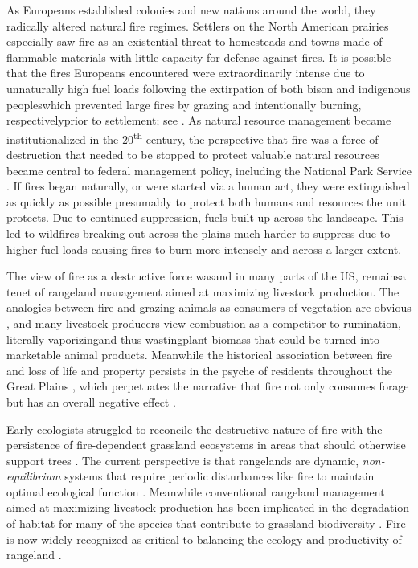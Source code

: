 As Europeans established colonies and new nations around the world, they radically altered natural fire regimes. 
Settlers on the North American prairies especially saw fire as an existential threat to homesteads and towns made of flammable materials with little capacity for defense against fires. 
It is possible that the fires Europeans encountered were extraordinarily intense due to unnaturally high fuel loads following the extirpation of both bison and indigenous peoples\textemdash which prevented large fires by grazing and intentionally burning, respectively\textemdash prior to settlement; see \citet{courtwright2011}. 
As natural resource management became institutionalized in the 20\textsuperscript{th} century, the perspective that fire was a force of destruction that needed to be stopped to protect valuable natural resources became central to federal management policy, including the National Park Service \citep{umbanhowarjr1996, bachelet2000}. 
If fires began naturally, or were started via a human act, they were extinguished as quickly as possible presumably to protect both humans and resources the unit protects. 
Due to continued suppression, fuels built up across the landscape. 
This led to wildfires breaking out across the plains much harder to suppress due to higher fuel loads causing fires to burn more intensely and across a larger extent.

The view of fire as a destructive force was\textemdash and in many parts of the US, remains\textemdash a tenet of rangeland management aimed at maximizing livestock production. 
The analogies between fire and grazing animals as consumers of vegetation are obvious \citep{bond2005}, and many livestock producers view combustion as a competitor to rumination, literally vaporizing\textemdash and thus wasting\textemdash plant biomass that could be turned into marketable animal products. 
Meanwhile the historical association between fire and loss of life and property persists in the psyche of residents throughout the Great Plains \citep{courtwright2007}, which perpetuates the narrative that fire not only consumes forage but has an overall negative effect \citep[e.g.,][]{wright1982}. 

Early ecologists struggled to reconcile the destructive nature of fire with the persistence of fire-dependent grassland ecosystems in areas that should otherwise support trees \citep{clements1916,transeau1935}. 
The current perspective is that rangelands are dynamic, \emph{non-equilibrium} systems that require periodic disturbances like fire to maintain optimal ecological function \citep{westoby1989}. 
Meanwhile conventional rangeland management aimed at maximizing livestock production has been implicated in the degradation of habitat for many of the species that contribute to grassland biodiversity \citep{fuhlendorf2001}. 
Fire is now widely recognized as critical to balancing the ecology and productivity of rangeland \citep{toombs2010, fuhlendorf2012}.

